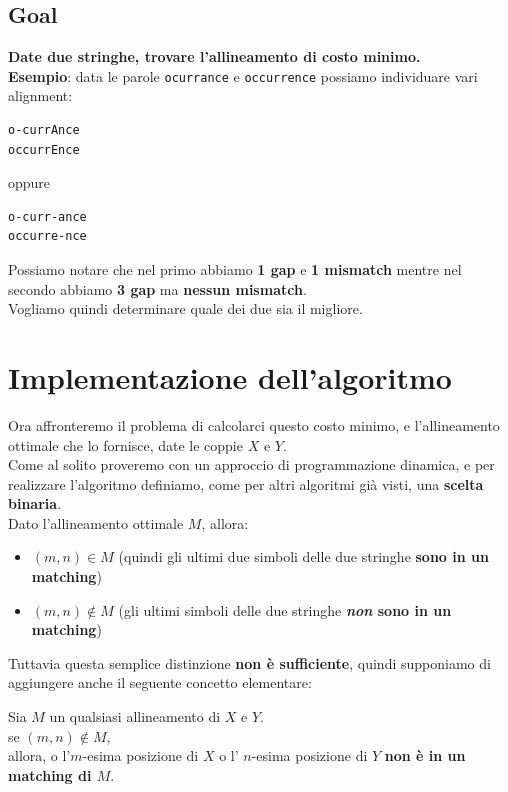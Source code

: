 \subsection{Goal}

\textbf{Date due stringhe, trovare l'allineamento di costo minimo.}\\

\textbf{Esempio}: data le parole \texttt{ocurrance} e
\texttt{occurrence} possiamo individuare vari alignment:

\begin{verbatim}
o-currAnce
occurrEnce
\end{verbatim}

oppure

\begin{verbatim}
o-curr-ance
occurre-nce
\end{verbatim}

Possiamo notare che nel primo abbiamo \textbf{1 gap} e \textbf{1
  mismatch} mentre nel secondo abbiamo \textbf{3 gap} ma \textbf{nessun
  mismatch}.\\

Vogliamo quindi determinare quale dei due sia il migliore.

\section{Implementazione dell'algoritmo}

Ora affronteremo il problema di calcolarci questo costo minimo, e
l'allineamento ottimale che lo fornisce, date le coppie $X$ e $Y$.\\
Come al solito proveremo con un approccio di programmazione dinamica, e
per realizzare l'algoritmo definiamo, come per altri algoritmi già
visti, una \textbf{scelta binaria}.\\ Dato l'allineamento ottimale $M$,
allora:
\begin{itemize}
  \item $(m,n) \in M$ (quindi gli ultimi due simboli delle due
        stringhe \textbf{sono in un matching})
  \item $(m,n) \notin M$ (gli ultimi
        simboli delle due stringhe \textbf{\emph{non} sono in un matching})
\end{itemize}

Tuttavia questa semplice distinzione \textbf{non è sufficiente}, quindi
supponiamo di aggiungere anche il seguente concetto elementare:
\begin{myblockquote}
  Sia $M$ un qualsiasi allineamento di $X$ e $Y$.\\
  se $(m,n) \notin M$,\\
  allora, o l'$m$-esima posizione di $X$ o l' $n$-esima posizione di $Y$
  \textbf{non è in un matching di $M$}.
\end{myblockquote}

